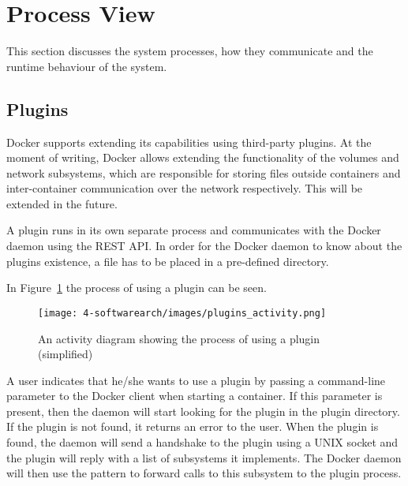 
\section{Process View}
\label{sec:viewprocess}
This section discusses the system processes, how they communicate and the runtime behaviour of the system.

\subsection{Plugins}
\label{sec:processplugins}
Docker supports extending its capabilities using third-party plugins. At the moment of writing, Docker allows extending the functionality of the volumes and network subsystems, which are responsible for storing files outside containers and inter-container communication over the network respectively. This will be extended in the future\cite{dockerplugindocs}.

A plugin runs in its own separate process and communicates with the Docker daemon using the REST API. In order for the Docker daemon to know about the plugins existence, a file has to be placed in a pre-defined directory. %

In Figure~\ref{fig:activity_plugin} the process of using a plugin can be seen.
\begin{figure}[H]
\caption{An activity diagram showing the process of using a plugin (simplified)}
\centering
\texttt{[image: 4-softwarearch/images/plugins\_activity.png]}
\label{fig:activity_plugin}
\end{figure}

A user indicates that he/she wants to use a plugin by passing a command-line parameter to the Docker client when starting a container. If this parameter is present, then the daemon will start looking for the plugin in the plugin directory. If the plugin is not found, it returns an error to the user. 
When the plugin is found, the daemon will send a handshake to the plugin using a UNIX socket and the plugin will reply with a list of subsystems it implements. 
The Docker daemon will then use the  pattern to forward calls to this subsystem to the plugin process.
